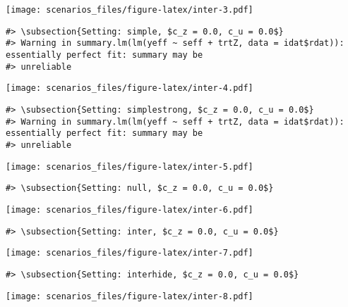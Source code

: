 \documentclass[
]{article}
\begin{document}
\texttt{[image: scenarios\_files/figure-latex/inter-3.pdf]}

\begin{verbatim}
#> \subsection{Setting: simple, $c_z = 0.0, c_u = 0.0$}
#> Warning in summary.lm(lm(yeff ~ seff + trtZ, data = idat$rdat)): essentially perfect fit: summary may be
#> unreliable
\end{verbatim}

\texttt{[image: scenarios\_files/figure-latex/inter-4.pdf]}

\begin{verbatim}
#> \subsection{Setting: simplestrong, $c_z = 0.0, c_u = 0.0$}
#> Warning in summary.lm(lm(yeff ~ seff + trtZ, data = idat$rdat)): essentially perfect fit: summary may be
#> unreliable
\end{verbatim}

\texttt{[image: scenarios\_files/figure-latex/inter-5.pdf]}

\begin{verbatim}
#> \subsection{Setting: null, $c_z = 0.0, c_u = 0.0$}
\end{verbatim}

\texttt{[image: scenarios\_files/figure-latex/inter-6.pdf]}

\begin{verbatim}
#> \subsection{Setting: inter, $c_z = 0.0, c_u = 0.0$}
\end{verbatim}

\texttt{[image: scenarios\_files/figure-latex/inter-7.pdf]}

\begin{verbatim}
#> \subsection{Setting: interhide, $c_z = 0.0, c_u = 0.0$}
\end{verbatim}

\texttt{[image: scenarios\_files/figure-latex/inter-8.pdf]}
\end{document}
